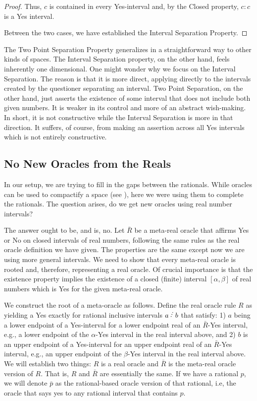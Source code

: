 \documentclass[12pt]{article}
\begin{document}
\begin{proof}
    Thus, $c$ is contained in every Yes-interval and, by the Closed property, $c:c$ is a Yes interval. 

    Between the two cases, we have established the Interval Separation Property. 
\end{proof}

The Two Point Separation Property generalizes in a straightforward way to other kinds of spaces. The Interval Separation property, on the other hand, feels inherently one dimensional. One might wonder why we focus on the Interval Separation. The reason is that it is more direct, applying directly to the intervals created by the questioner separating an interval. Two Point Separation, on the other hand, just asserts the existence of some interval that does not include both given numbers. It is weaker in its control and more of an abstract wish-making. In short, it is not constructive while the Interval Separation is more in that direction. It suffers, of course, from making an assertion across all Yes intervals which is not entirely constructive. 


\subsection{No New Oracles from the Reals}

In our setup, we are trying to fill in the gaps between the rationals. While oracles can be used to compactify a space (see \cite{taylor23metric} ),  here we were using them to complete the rationals. The question arises, do we get new oracles using real number intervals? 

The answer ought to be, and is, no. Let $\bar{R}$ be a meta-real oracle that affirms Yes or No on closed intervals of real numbers, following the same rules as the real oracle definition we have given. The properties are the same except now we are using more general intervals. We need to show that every meta-real oracle is rooted and, therefore, representing a real oracle. Of crucial importance is that the existence property implies the existence of a closed (finite) interval $[\alpha, \beta]$ of real numbers which is Yes for the given meta-real oracle. 

We construct the root of a meta-oracle as follows. Define the real oracle rule $R$ as yielding a Yes exactly for rational inclusive intervals $a\lte b$ that satisfy: 1) $a$ being a lower endpoint of a Yes-interval for a lower endpoint real of an $\bar{R}$-Yes interval, e.g., a lower endpoint of the $\alpha$-Yes interval in the real interval above,  and 2) $b$ is an upper endpoint of a Yes-interval for an upper endpoint real of an $\bar{R}$-Yes interval, e.g., an upper endpoint of the $\beta$-Yes interval in the real interval above. We will establish two things: $R$ is a real oracle and $\bar{R}$ is the meta-real oracle version of $R$. That is, $R$ and $\bar{R}$ are essentially the same. If we have a rational $p$, we will denote $\bar{p}$ as the rational-based oracle version of that rational, i.e, the oracle that says yes to any rational interval that contains $p$. 
\end{document}
